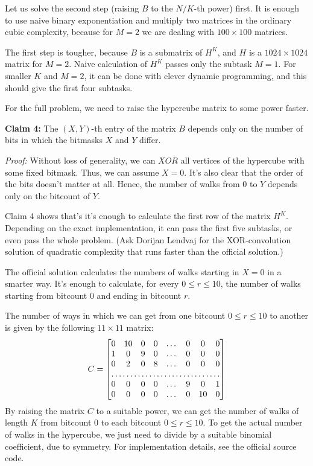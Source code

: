 Let us solve the second step (raising $B$ to the $N/K$-th power) first.
It is enough to use naive binary exponentiation and multiply two matrices
in the ordinary cubic complexity, because for $M=2$ we are dealing with $100
\times 100$ matrices.

The first step is tougher, because $B$ is a submatrix of $H^K$, and $H$ is a
$1024 \times 1024$ matrix for $M=2$. Naive calculation of $H^K$ passes only the
subtask $M=1$. For smaller $K$ and $M=2$, it can be done with clever dynamic
programming, and this should give the first four subtasks.

For the full problem, we need to raise the hypercube matrix to some power
faster.

\textbf{Claim 4:} The $(X, Y)$-th entry of the matrix $B$ depends only on the
number of bits in which the bitmasks $X$ and $Y$ differ.

\textit{Proof:} Without loss of generality, we can $XOR$ all vertices of the
hypercube with some fixed bitmask. Thus, we can assume $X = 0$.
It's also clear that the order of the bits doesn't matter at all.
Hence, the number of walks from $0$ to $Y$ depends only on the bitcount of $Y$.

Claim 4 shows that's it's enough to calculate the first row of the matrix $H^K$.
Depending on the exact implementation, it can pass the first five subtasks, or
even pass the whole problem. (Ask Dorijan Lendvaj for the XOR-convolution 
solution of quadratic complexity that runs faster than the official solution.)

The official solution calculates the numbers of walks starting in $X=0$ 
in a smarter way. It's enough to calculate, for every $0 \le r \le 10$,
 the number of walks starting from bitcount $0$ and ending in bitcount $r$.

The number of ways in which we can get from one bitcount $0 \le r \le 10$ to
another is given by the following $11 \times 11$ matrix:
\[
  C =
\begin{bmatrix}
  0       & 10 & 0 & 0 & \dots  & 0 & 0 & 0 \\
    1       & 0 & 9 & 0 & \dots & 0 & 0 & 0 \\
    0       & 2 & 0 & 8 & \dots & 0 & 0 & 0 \\
    \hdotsfor{8} \\
    0       & 0 & 0 & 0 & \dots & 9 & 0 & 1 \\
    0       & 0 & 0 & 0 & \dots & 0 & 10 & 0 \\
\end{bmatrix}
\]
By raising the matrix $C$ to a suitable power, we can get the number of walks of
length $K$ from bitcount $0$ to each bitcount $0 \le r \le 10$.
To get the actual number of walks in the hypercube, we just need to divide by a
suitable binomial coefficient, due to symmetry.
For implementation details, see the official source code.

